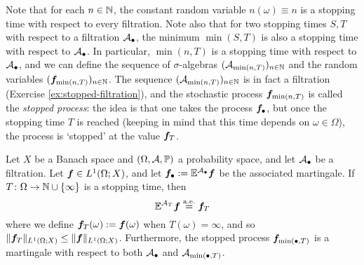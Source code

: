 Note that for each $n \in \mathbb{N}$, the constant random variable $n(\omega) \equiv n$ is a stopping time with respect to every filtration.
Note also that for two stopping times $S,T$ with respect to a filtration $\mathcal{A}_{\bullet}$, the minimum $\min(S,T)$ is also a stopping time with respect to $\mathcal{A}_{\bullet}$.
In particular, $\min(n,T)$ is a stopping time with respect to $\mathcal{A}_{\bullet}$, and we can define the sequence of $\sigma$-algebras $(\mathcal{A}_{\min(n,T)})_{n \in \mathbb{N}}$ and the random variables $(\bm{f}_{\min(n,T)})_{n \in \mathbb{N}}$.
The sequence $(\mathcal{A}_{\min(n,T)})_{n \in \mathbb{N}}$ is in fact a filtration (Exercise \ref{ex:stopped-filtration}), and the stochastic process $\bm{f}_{\min(n,T)}$ is called the \emph{stopped process}: the idea is that one takes the process $\bm{f}_{\bullet}$, but once the stopping time $T$ is reached (keeping in mind that this time depends on $\omega \in \Omega$), the process is `stopped' at the value $\bm{f}_{T}$.

\begin{prop}\label{prop:stopped-martingale}
  Let $X$ be a Banach space and $(\Omega,\mathcal{A},\mathbb{P})$ a probability space, and let $\mathcal{A}_{\bullet}$ be a filtration.
  Let $\bm{f} \in L^1(\Omega;X)$, and let $\bm{f}_{\bullet} := \mathbb{E}^{\mathcal{A}_{\bullet}} \bm{f}$ be the associated martingale. 
  If $T \colon \Omega \rightarrow \mathbb{N} \cup \{\infty\}$ is a stopping time, then
  \begin{equation}\label{eq:stopmgale}
    \mathbb{E}^{\mathcal{A}_{T}} \bm{f} \stackrel{\mathrm{a.e.}}{=} \bm{f}_{T}
  \end{equation}
  where we define $\bm{f}_{T}(\omega) := \bm{f}(\omega)$ when $T(\omega) = \infty$, and so $\|\bm{f}_{T}\|_{L^1(\Omega;X)} \leq \|\bm{f}\|_{L^1(\Omega;X)}$.
  Furthermore, the stopped process $\bm{f}_{\min(\bullet,T)}$ is a martingale with respect to both $\mathcal{A}_{\bullet}$ and $\mathcal{A}_{\min(\bullet,T)}$.
\end{prop}

